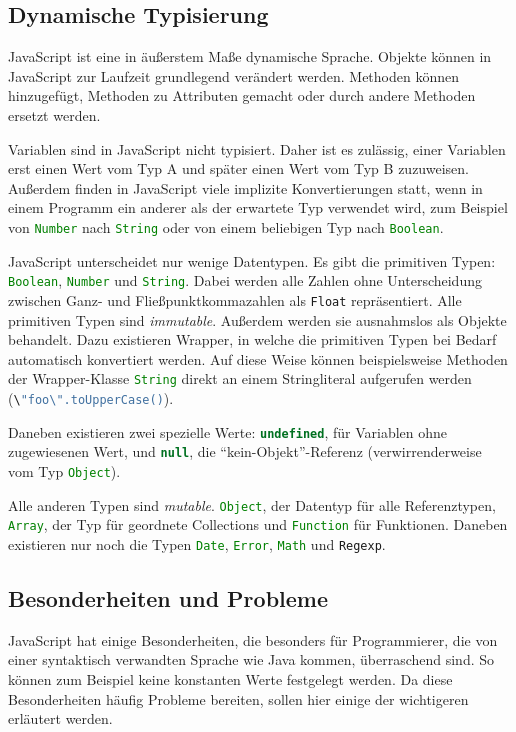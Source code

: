 \documentclass[a4paper, 12pt, hidelinks, listof=totoc, listoftables=totoc, bibliography=totoc]{scrreprt}
\newcommand{\js}[1]{\lstinline[language=JavaScript, style=inline]|#1|}
\begin{document}
\subsection{Dynamische Typisierung}

JavaScript ist eine in äußerstem Maße dynamische Sprache. Objekte können in JavaScript zur Laufzeit grundlegend verändert werden. Methoden können hinzugefügt, Methoden zu Attributen gemacht oder durch andere Methoden ersetzt werden.

Variablen sind in JavaScript nicht typisiert. Daher ist es zulässig, einer Variablen erst einen Wert vom Typ A und später einen Wert vom Typ B zuzuweisen. Außerdem finden in JavaScript viele implizite Konvertierungen statt, wenn in einem Programm ein anderer als der erwartete Typ verwendet wird, zum Beispiel von \js{Number} nach \js{String} oder von einem beliebigen Typ nach \js{Boolean}.

JavaScript unterscheidet nur wenige Datentypen. Es gibt die primitiven Typen: \js{Boolean}, \js{Number} und \js{String}. 
Dabei werden alle Zahlen ohne Unterscheidung zwischen Ganz- und Fließpunktkommazahlen als \js{Float} repräsentiert. Alle primitiven Typen sind \emph{immutable}. Außerdem werden sie ausnahmslos als Objekte behandelt. Dazu existieren Wrapper, in welche die primitiven Typen bei Bedarf automatisch konvertiert werden. Auf diese Weise können beispielsweise Methoden der Wrapper-Klasse \js{String} direkt an einem Stringliteral aufgerufen werden (\js{\"foo\".toUpperCase()}).

Daneben existieren zwei spezielle Werte: \js{undefined}, für Variablen ohne zugewiesenen Wert, und \js{null}, die "`kein-Objekt"'-Referenz (verwirrenderweise vom Typ \js{Object}).

Alle anderen Typen sind \emph{mutable}. \js{Object}, der Datentyp für alle Referenztypen, \js{Array}, der Typ für geordnete Collections und \js{Function} für Funktionen. Daneben existieren nur noch die Typen \js{Date}, \js{Error}, \js{Math} und \js{Regexp}. \cite[S. 29 ff.]{flanagan2011.JDG}


\subsection{Besonderheiten und Probleme}\label{subsec:js-problems}

JavaScript hat einige Besonderheiten, die besonders für Programmierer, die von einer syntaktisch verwandten Sprache wie Java kommen, überraschend sind. So können zum Beispiel keine konstanten Werte festgelegt werden. Da diese Besonderheiten häufig Probleme bereiten, sollen hier einige der wichtigeren erläutert werden.
\end{document}
